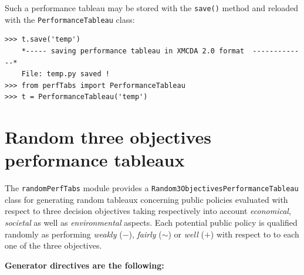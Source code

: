 Such a performance tableau may be stored with the \texttt{save()} method and reloaded with the \texttt{PerformanceTableau} class:
\begin{lstlisting}
>>> t.save('temp')
    *----- saving performance tableau in XMCDA 2.0 format  -------------*
    File: temp.py saved !
>>> from perfTabs import PerformanceTableau
>>> t = PerformanceTableau('temp')
\end{lstlisting}

\section{Random three objectives performance tableaux}
\label{sec:6.4}

The \texttt{randomPerfTabs} module provides a \texttt{Random3ObjectivesPerfor\-mance\-Tableau} class for generating random tableaux concerning public policies evaluated with respect to three decision objectives taking respectively into account \emph{economical}, \emph{societal} as well as \emph{environmental} aspects. Each potential public policy is qualified randomly as performing \emph{weakly} ($-$), \emph{fairly} ($\sim$) or \emph{well} ($+$) with respect to to each one of the three objectives. 

\noindent \textbf{Generator directives are the following:}

